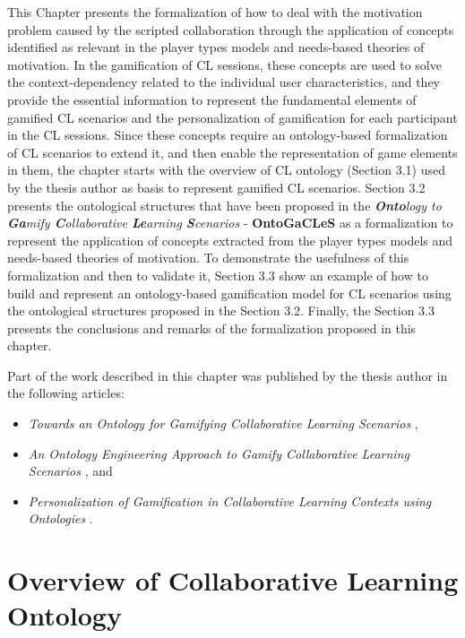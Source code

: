 
This Chapter presents the formalization of how to deal with the motivation problem caused by the scripted collaboration through the application of concepts identified as relevant in the player types models and needs-based theories of motivation. In the gamification of CL sessions, these concepts are used to solve the context-dependency related to the individual user characteristics, and they provide the essential information to represent the fundamental elements of gamified CL scenarios and the personalization of gamification for each participant in the CL sessions. Since these concepts require an ontology-based formalization of CL scenarios to extend it, and then enable the representation of game elements in them, the chapter starts with the overview of CL ontology (Section 3.1) used by the thesis author as basis to represent gamified CL scenarios. Section 3.2 presents the ontological structures that have been proposed in the \emph{\textbf{Onto}logy to \textbf{Ga}mify \textbf{C}ollaborative \textbf{Le}arning \textbf{S}cenarios} - \textbf{OntoGaCLeS} as a formalization to represent the application of concepts extracted from the player types models and needs-based theories of motivation. To demonstrate the usefulness of this formalization and then to validate it, Section 3.3 show an example of how to build and represent an ontology-based gamification model for CL scenarios using the ontological structures proposed in the Section 3.2. Finally, the Section 3.3 presents the conclusions and remarks of the formalization proposed in this chapter.

Part of the work described in this chapter was published by the thesis author in the following articles:

\begin{itemize}
\item \emph{Towards an Ontology for Gamifying Collaborative Learning Scenarios} \cite{ChallcoMoreiraMizoguchiIsotani2014a},
\item \emph{An Ontology Engineering Approach to Gamify Collaborative Learning Scenarios} \cite{ChallcoMoreiraMizoguchiIsotani2014}, and
\item \emph{Personalization of Gamification in Collaborative Learning Contexts using Ontologies} \cite{ChallcoMoreiraBittencourtMizoguchiIsotani2015}.
\end{itemize}

\section{Overview of Collaborative Learning Ontology}
\label{sec:overview-of-cl-ontology}

